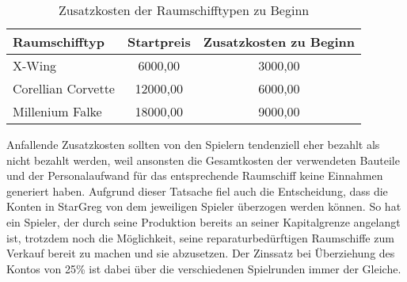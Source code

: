\begin{table}[ht]\small
     \centering
     \begin{tabular}{ | l | c | c | }
          \hline
          Raumschifftyp & Startpreis & Zusatzkosten zu Beginn \\
          \hline \hline
          X-Wing &  6000,00\curr{} & 3000,00\curr{}\\ \hline
          Corellian Corvette & 12000,00\curr{} & 6000,00\curr{}\\ \hline
          Millenium Falke & 18000,00\curr{} & 9000,00\curr{} \\
          \hline
     \end{tabular}
     \caption{Zusatzkosten der Raumschifftypen zu Beginn}
     \label{tab:spielwelt-datenbasis-raumschiffe-zusammensetzung-2}
\end{table}

Anfallende Zusatzkosten sollten von den Spielern tendenziell eher bezahlt als nicht bezahlt werden, weil ansonsten die Gesamtkosten der verwendeten Bauteile und der Personalaufwand für das entsprechende Raumschiff keine Einnahmen generiert haben. Aufgrund dieser Tatsache fiel auch die Entscheidung, dass die Konten in StarGreg von dem jeweiligen Spieler überzogen werden können. So hat ein Spieler, der durch seine Produktion bereits an seiner Kapitalgrenze angelangt ist, trotzdem noch die Möglichkeit, seine reparaturbedürftigen Raumschiffe zum Verkauf bereit zu machen und sie abzusetzen. Der Zinssatz bei Überziehung des Kontos von 25\% ist dabei über die verschiedenen Spielrunden immer der Gleiche.
